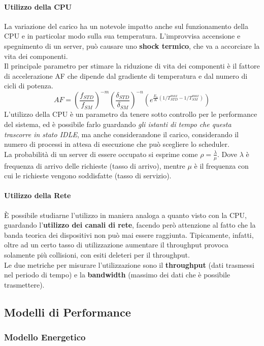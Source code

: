 \documentclass{article}
\begin{document}
		\paragraph{Utilizzo della CPU}
		La variazione del carico ha un notevole impatto anche sul funzionamento della CPU e in particolar modo sulla sua temperatura. L'improvvisa accensione e spegnimento di un server, può causare uno \textbf{shock termico}, che va a accorciare la vita dei componenti.\\
		Il principale parametro per stimare la riduzione di vita dei componenti è il fattore di accelerazione AF che dipende dal gradiente di temperatura e dal numero di cicli di potenza.
		\[
		AF = (\frac{f_{STD}}{f_{SM}})^{-m} (\frac{\delta_{STD}}{\delta_{SM}})^{-n}  (e^{\frac{E_a}{K}(1/T^{max}_{STD}-1/T^{max}_{SM})})
		\]
		L'utilizzo della CPU è un parametro da tenere sotto controllo per le performance del sistema, ed è possibile farlo guardando \emph{gli istanti di tempo che questa trascorre in stato IDLE}, ma anche considerandone il carico, considerando il numero di processi in attesa di esecuzione che può scegliere lo scheduler.\\
		La probabilità di un server di essere occupato si esprime come
		\(\rho = \frac{\lambda}{\mu}\). Dove \(\lambda\) è frequenza di arrivo delle richieste (tasso di arrivo), mentre \(\mu\) è il	frequenza con cui le richieste vengono soddisfatte (tasso di servizio).
		
		\paragraph{Utilizzo della Rete}
		È possibile studiarne l'utilizzo in maniera analoga a quanto visto con la CPU, guardando l'\textbf{utilizzo dei canali di rete}, facendo però attenzione	al fatto che la banda teorica dei dispositivi non può mai essere raggiunta. Tipicamente, infatti, oltre ad un certo tasso di utilizzazione aumentare il throughput provoca solamente più collisioni, con esiti deleteri per il throughput.\\
		Le due metriche per misurare l'utilizzazione sono il \textbf{throughput} (dati trasmessi nel periodo di tempo) e la \textbf{bandwidth} (massimo dei dati che è possibile trasmettere).
		
		\subsection{Modelli di Performance}\label{modelli-di-performance}
		\subsubsection{Modello Energetico}\label{modello-energetico}
		
\end{document}
